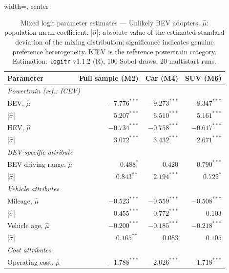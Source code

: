 \documentclass[a4paper,fleqn]{cas-sc}   %
\begin{document}
\begin{table}[pos=H]
\caption{Mixed logit parameter estimates --- Unlikely BEV adopters. $\hat{\mu}$: population mean coefficient. $|\hat{\sigma}|$: absolute value of the estimated standard deviation of the mixing distribution; significance indicates genuine preference heterogeneity. ICEV is the reference powertrain category. Estimation: \texttt{logitr} v1.1.2 (R), 100 Sobol draws, 20 multistart runs.}
\label{table:mxl_unlikely}
\begin{adjustbox}{width=\textwidth, center}
{\renewcommand{\arraystretch}{1.25}
\begin{tabular}{lrrr}
\toprule
\textbf{Parameter} & \textbf{Full sample (M2)} & \textbf{Car (M4)} & \textbf{SUV (M6)} \\
\midrule
\multicolumn{4}{l}{\textit{Powertrain (ref.: ICEV)}} \\[2pt]
\quad BEV, $\hat{\mu}$               & $-7.776^{***}$  & $-9.273^{***}$  & $-8.347^{***}$ \\
\quad\quad $|\hat{\sigma}|$          & $5.207^{***}$   & $6.510^{***}$   & $5.161^{***}$  \\[3pt]
\quad HEV, $\hat{\mu}$               & $-0.734^{***}$  & $-0.758^{***}$  & $-0.617^{***}$ \\
\quad\quad $|\hat{\sigma}|$          & $3.072^{***}$   & $3.432^{***}$   & $2.671^{***}$  \\[3pt]
\multicolumn{4}{l}{\textit{BEV-specific attribute}} \\[2pt]
\quad BEV driving range, $\hat{\mu}$ & $\phantom{-}0.488^{*}$   & $\phantom{-}0.420$        & $\phantom{-}0.790^{***}$ \\
\quad\quad $|\hat{\sigma}|$          & $0.843^{**}$    & $2.194^{***}$   & $0.722^{*}$    \\[3pt]
\multicolumn{4}{l}{\textit{Vehicle attributes}} \\[2pt]
\quad Mileage, $\hat{\mu}$           & $-0.523^{***}$  & $-0.559^{***}$  & $-0.508^{***}$ \\
\quad\quad $|\hat{\sigma}|$          & $0.455^{***}$   & $0.772^{***}$   & $0.103$        \\[3pt]
\quad Vehicle age, $\hat{\mu}$       & $-0.200^{***}$  & $-0.185^{***}$  & $-0.218^{***}$ \\
\quad\quad $|\hat{\sigma}|$          & $0.165^{**}$    & $0.083$         & $0.105$        \\[3pt]
\multicolumn{4}{l}{\textit{Cost attributes}} \\[2pt]
\quad Operating cost, $\hat{\mu}$    & $-1.788^{***}$  & $-2.026^{***}$  & $-1.718^{***}$ \\

\end{tabular}}
\end{adjustbox}
\end{table}
\end{document}
